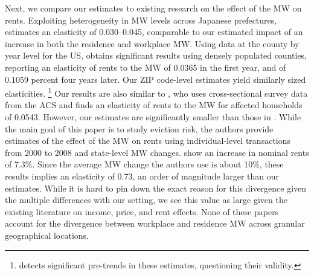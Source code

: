 Next, we compare our estimates to existing research on the effect of 
the MW on rents.
Exploiting heterogeneity in MW levels across Japanese prefectures,
\textcite{Yamagishi2021} estimates an elasticity of 0.030--0.045,
comparable to our estimated impact of an increase in both the residence and 
workplace MW.
Using data at the county by year level for the US, 
\textcite[][, Tables 1 and 2]{Yamagishi2019} obtains significant results 
using densely populated counties, reporting an elasticity of rents to the MW 
of $0.0365$ in the first year, and of $0.1059$ percent four years later.
Our ZIP code-level estimates yield similarly sized elasticities.%
\footnote{\textcite[][Table 3]{Yamagishi2019} detects significant pre-trends in
    these estimates, questioning their validity.} 
Our results are also similar to \textcite[][, Table 1]{Hughes2020}, who uses 
cross-sectional survey data from the ACS and finds an elasticity of rents to 
the MW for affected households of 0.0543.
However, our estimates are significantly smaller than those in 
\textcite{AgarwalEtAl2022}.
While the main goal of this paper is to study eviction risk, the authors 
provide estimates of the effect of the MW on rents using individual-level 
transactions from 2000 to 2008 and state-level MW changes.
\textcite[][, Section 5.1]{AgarwalEtAl2022} show an increase in nominal rents
of 7.3\%. 
Since the average MW change the authors use is about 10\%, these results implies 
an elasticity of 0.73, an order of magnitude larger than our estimates.
While it is hard to pin down the exact reason for this divergence given the 
multiple differences with our setting, we see this value as large given the 
existing literature on income, price, and rent effects.
None of these papers account for the divergence between workplace and residence
MW across granular geographical locations.
